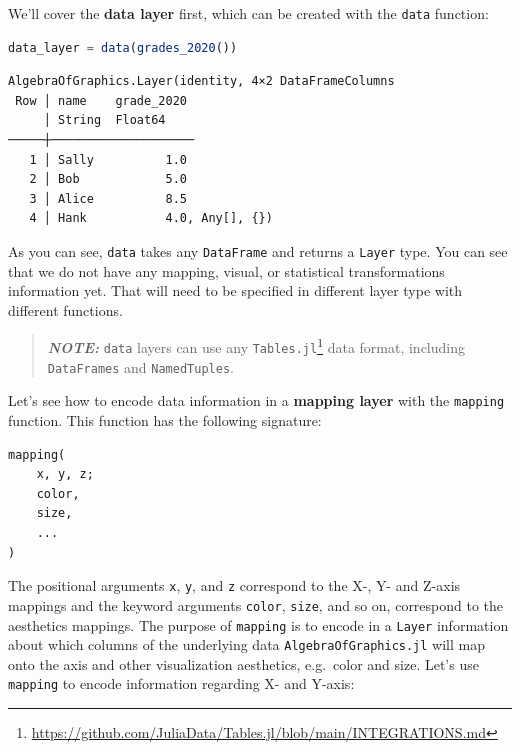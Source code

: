 \documentclass[
  notoc %
]{tufte-book}
\DeclareRobustCommand{\href}[2]{#2\footnote{\url{#1}}}
\newcommand{\passthrough}[1]{#1}
\begin{document}
We'll cover the \textbf{data layer} first, which can be created with the
\passthrough{\lstinline!data!} function:

\begin{lstlisting}[language=Julia]
data_layer = data(grades_2020())
\end{lstlisting}

\begin{lstlisting}[language=Output]
AlgebraOfGraphics.Layer(identity, 4×2 DataFrameColumns
 Row │ name    grade_2020
     │ String  Float64
─────┼────────────────────
   1 │ Sally          1.0
   2 │ Bob            5.0
   3 │ Alice          8.5
   4 │ Hank           4.0, Any[], {})
\end{lstlisting}

As you can see, \passthrough{\lstinline!data!} takes any
\passthrough{\lstinline!DataFrame!} and returns a
\passthrough{\lstinline!Layer!} type. You can see that we do not have
any mapping, visual, or statistical transformations information yet.
That will need to be specified in different layer type with different
functions.

\begin{quote}
\textbf{\emph{NOTE:}} \passthrough{\lstinline!data!} layers can use any
\href{https://github.com/JuliaData/Tables.jl/blob/main/INTEGRATIONS.md}{\passthrough{\lstinline!Tables.jl!}}
data format, including \passthrough{\lstinline!DataFrames!} and
\passthrough{\lstinline!NamedTuples!}.
\end{quote}

Let's see how to encode data information in a \textbf{mapping layer}
with the \passthrough{\lstinline!mapping!} function. This function has
the following signature:

\begin{lstlisting}
mapping(
    x, y, z;
    color,
    size,
    ...
)
\end{lstlisting}

The positional arguments \passthrough{\lstinline!x!},
\passthrough{\lstinline!y!}, and \passthrough{\lstinline!z!} correspond
to the X-, Y- and Z-axis mappings and the keyword arguments
\passthrough{\lstinline!color!}, \passthrough{\lstinline!size!}, and so
on, correspond to the aesthetics mappings. The purpose of
\passthrough{\lstinline!mapping!} is to encode in a
\passthrough{\lstinline!Layer!} information about which columns of the
underlying data \passthrough{\lstinline!AlgebraOfGraphics.jl!} will map
onto the axis and other visualization aesthetics, e.g.~color and size.
Let's use \passthrough{\lstinline!mapping!} to encode information
regarding X- and Y-axis:
\end{document}

